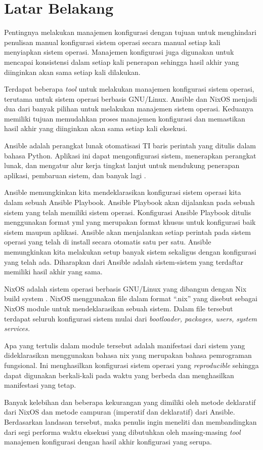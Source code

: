 \documentclass[10pt,twoside]{report}
\begin{document}
\section{Latar Belakang}
\begin{adjustwidth}{0.70cm}{}
	\vspace{-3mm}
	\hspace\parindent
	Pentingnya melakukan manajemen konfigurasi dengan tujuan untuk menghindari
	penulisan manual konfigurasi sistem operasi secara manual setiap kali
	menyiapkan sistem operasi. Manajemen konfigurasi juga digunakan untuk
	mencapai konsistensi dalam setiap kali penerapan sehingga hasil akhir yang
	diinginkan akan sama setiap kali dilakukan.

	Terdapat beberapa \textit{tool} untuk melakukan manajemen konfigurasi sistem operasi,
	terutama untuk sistem operasi berbasis GNU/Linux. Ansible dan NixOS menjadi
	dua dari banyak pilihan untuk melakukan manajemen sistem operasi. Keduanya
	memiliki tujuan memudahkan proses manajemen konfigurasi dan memastikan hasil
	akhir yang diinginkan akan sama setiap kali eksekusi.

	Ansible adalah perangkat lunak otomatisasi TI baris perintah yang ditulis
	dalam bahasa Python. Aplikasi ini dapat mengonfigurasi sistem, menerapkan
	perangkat lunak, dan mengatur alur kerja tingkat lanjut untuk mendukung
	penerapan aplikasi, pembaruan sistem, dan banyak lagi \parencite{AnsibleRedHat}.

	Ansible memungkinkan kita mendeklarasikan konfigurasi sistem operasi kita dalam
	sebuah Ansible Playbook. Ansible Playbook akan dijalankan pada sebuah sistem
	yang telah memiliki sistem operasi. Konfigurasi Ansible Playbook ditulis
	menggunakan format yml yang merupakan format khusus untuk konfigurasi baik
	sistem maupun aplikasi. Ansible akan menjalankan setiap perintah pada sistem
	operasi yang telah di install secara otomatis satu per satu. Ansible
	memungkinkan kita melakukan setup banyak sistem sekaligus dengan konfigurasi
	yang telah ada. Diharapkan dari Ansible adalah sistem-sistem yang terdaftar
	memiliki hasil akhir yang sama.

	NixOS adalah sistem operasi berbasis GNU/Linux yang dibangun dengan Nix build
	system \parencite{hownixworks} . NixOS menggunakan file dalam format “.nix”
	yang disebut sebagai NixOS module untuk mendeklarasikan sebuah sistem. Dalam
	file tersebut terdapat seluruh konfigurasi sistem mulai dari
	\textit{bootloader, packages, users, system services.}

	Apa yang tertulis dalam module tersebut adalah manifestasi dari sistem yang
	dideklarasikan menggunakan bahasa nix yang merupakan bahasa pemrograman
	fungsional. Ini menghasilkan konfigurasi sistem operasi yang \textit{reproducible}
	sehingga dapat digunakan berkali-kali pada waktu yang berbeda dan
	menghasilkan manifestasi yang tetap.

	Banyak kelebihan dan beberapa kekurangan yang dimiliki oleh metode deklaratif
	dari NixOS dan metode campuran (imperatif dan deklaratif) dari Ansible.
	Berdasarkan landasan tersebut, maka penulis ingin meneliti dan membandingkan
	dari segi performa waktu eksekusi yang dibutuhkan oleh masing-masing
	\textit{tool} manajemen konfigurasi dengan hasil akhir konfigurasi yang serupa.
\end{adjustwidth}
\end{document}
